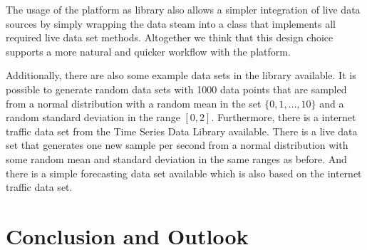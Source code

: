 \documentclass[runningheads,a4paper,11pt]{llncs}
\begin{document}
The usage of the platform as library also allows a simpler integration of live data sources by simply wrapping the data steam into a class that implements all required live data set methods.
Altogether we think that this design choice supports a more natural and quicker workflow with the platform.

Additionally, there are also some example data sets in the library available.
It is possible to generate random data sets with 1000 data points that are sampled from a normal distribution with a random mean in the set \(\{0,1,\ldots,10\}\) and a random standard deviation in the range \([0,2]\).
Furthermore, there is a internet traffic data set from the Time Series Data Library \cite{TSDL} available.
There is a live data set that generates one new sample per second from a normal distribution with some random mean and standard deviation in the same ranges as before.
And there is a simple forecasting data set available which is also based on the internet traffic data set.



\section{Conclusion and Outlook}\label{sec:conclusion}




\end{document}
